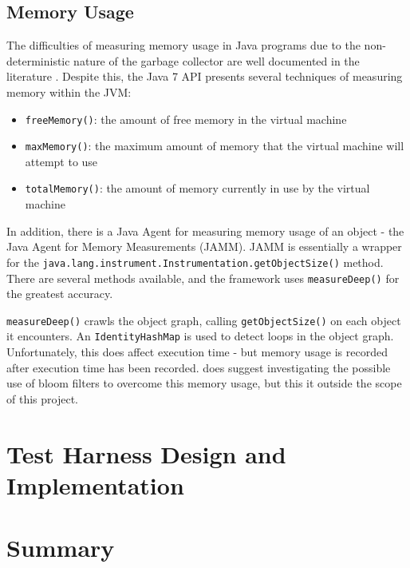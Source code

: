 	\subsection{Memory Usage} \label{sec:methodology/measurements/memory}
	The difficulties of measuring memory usage in Java programs due to the non-deterministic nature of the garbage collector are well documented in the literature \citep{Kim2000,Ogata2010}. Despite this, the Java 7 API presents several techniques \citep{RuntimeDocs} of measuring memory within the JVM:
	
	\begin{itemize}
		\item \texttt{freeMemory()}: the amount of free memory in the virtual machine
		\item \texttt{maxMemory()}: the maximum amount of memory that the virtual machine will attempt to use
		\item \texttt{totalMemory()}: the amount of memory currently in use by the virtual machine
	\end{itemize}
	
	In addition, there is a Java Agent for measuring memory usage of an object - the Java Agent for Memory Measurements \citep{JAMM} (JAMM). JAMM is essentially a wrapper for the \texttt{java.lang.instrument.Instrumentation.getObjectSize()} method. There are several methods available, and the framework uses \texttt{measureDeep()} for the greatest accuracy.
	
	\texttt{measureDeep()} crawls the object graph, calling \texttt{getObjectSize()} on each object it encounters. An \texttt{IdentityHashMap} is used to detect loops in the object graph. Unfortunately, this does affect execution time - but memory usage is recorded after execution time has been recorded. \citeauthor{JAMM} does suggest investigating the possible use of bloom filters to overcome this memory usage, but this it outside the scope of this project.
	
\section{Test Harness Design and Implementation} \label{sec:methodology/implementation}
	
\section{Summary} \label{sec:methodology/summary}